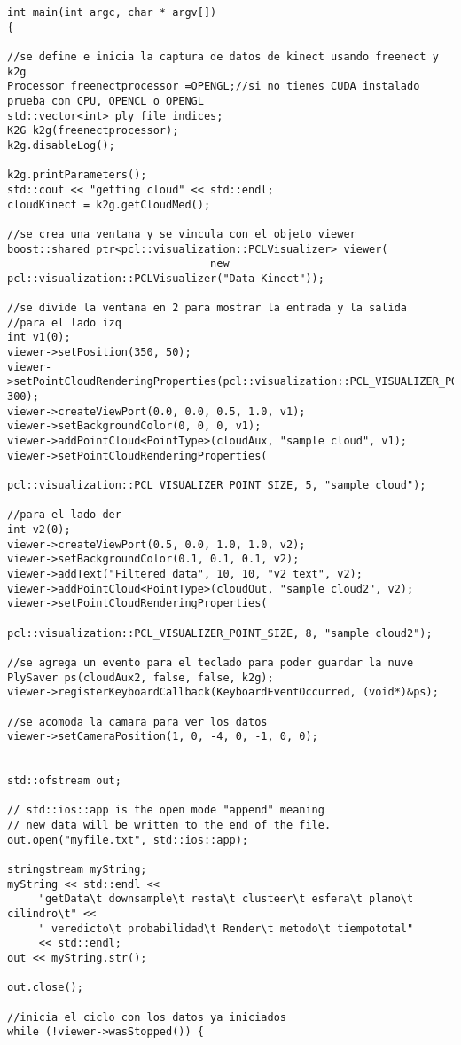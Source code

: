 {\begin{lstlisting}[caption={Archivo test.cpp}]
int main(int argc, char * argv[])
{

//se define e inicia la captura de datos de kinect usando freenect y k2g
Processor freenectprocessor =OPENGL;//si no tienes CUDA instalado prueba con CPU, OPENCL o OPENGL
std::vector<int> ply_file_indices;
K2G k2g(freenectprocessor);
k2g.disableLog();

k2g.printParameters();
std::cout << "getting cloud" << std::endl;
cloudKinect = k2g.getCloudMed();

//se crea una ventana y se vincula con el objeto viewer 
boost::shared_ptr<pcl::visualization::PCLVisualizer> viewer(
								new pcl::visualization::PCLVisualizer("Data Kinect"));

//se divide la ventana en 2 para mostrar la entrada y la salida
//para el lado izq
int v1(0);
viewer->setPosition(350, 50);
viewer->setPointCloudRenderingProperties(pcl::visualization::PCL_VISUALIZER_POINT_SIZE, 300);
viewer->createViewPort(0.0, 0.0, 0.5, 1.0, v1);
viewer->setBackgroundColor(0, 0, 0, v1);
viewer->addPointCloud<PointType>(cloudAux, "sample cloud", v1);
viewer->setPointCloudRenderingProperties(
							pcl::visualization::PCL_VISUALIZER_POINT_SIZE, 5, "sample cloud");

//para el lado der
int v2(0);
viewer->createViewPort(0.5, 0.0, 1.0, 1.0, v2);
viewer->setBackgroundColor(0.1, 0.1, 0.1, v2);
viewer->addText("Filtered data", 10, 10, "v2 text", v2);
viewer->addPointCloud<PointType>(cloudOut, "sample cloud2", v2);
viewer->setPointCloudRenderingProperties(
							pcl::visualization::PCL_VISUALIZER_POINT_SIZE, 8, "sample cloud2");

//se agrega un evento para el teclado para poder guardar la nuve
PlySaver ps(cloudAux2, false, false, k2g);
viewer->registerKeyboardCallback(KeyboardEventOccurred, (void*)&ps);

//se acomoda la camara para ver los datos
viewer->setCameraPosition(1, 0, -4, 0, -1, 0, 0);


std::ofstream out;

// std::ios::app is the open mode "append" meaning
// new data will be written to the end of the file.
out.open("myfile.txt", std::ios::app);

stringstream myString;
myString << std::endl <<
	 "getData\t downsample\t resta\t clusteer\t esfera\t plano\t cilindro\t" <<
	 " veredicto\t probabilidad\t Render\t metodo\t tiempototal" 
	 << std::endl;
out << myString.str();

out.close();

//inicia el ciclo con los datos ya iniciados
while (!viewer->wasStopped()) {



\end{lstlisting}}
